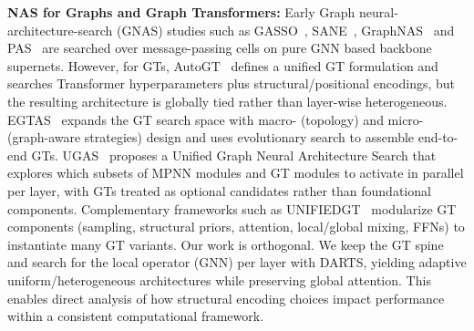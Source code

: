\documentclass[lettersize,journal]{IEEEtran}
\begin{document}
\textbf{NAS for Graphs and Graph Transformers:} Early Graph neural-architecture-search (GNAS) studies such as GASSO~\cite{qin_graph_2021}, SANE~\cite{zhao_search_2021}, GraphNAS~\cite{gao_graphnas_2019} and PAS~\cite{wei_neural_2024} are searched over message-passing cells on pure GNN based backbone supernets. However, for GTs, AutoGT~\cite{zhang_autogt_2023} defines a unified GT formulation and searches Transformer hyperparameters plus structural/positional encodings, but the resulting architecture is globally tied rather than layer-wise heterogeneous. EGTAS~\cite{wang_automatic_2024} expands the GT search space with macro- (topology) and micro- (graph-aware strategies) design and uses evolutionary search to assemble end-to-end GTs. UGAS~\cite{song_towards_2025} proposes a Unified Graph Neural Architecture Search that explores which subsets of MPNN modules and GT modules to activate in parallel per layer, with GTs treated as optional candidates rather than foundational components. Complementary frameworks such as UNIFIEDGT~\cite{lin_unifiedgt_2024} modularize GT components (sampling, structural priors, attention, local/global mixing, FFNs) to instantiate many GT variants. Our work is orthogonal. We keep the GT spine and search for the local operator (GNN) per layer with DARTS, yielding adaptive uniform/heterogeneous architectures while preserving global attention. This enables direct analysis of how structural encoding choices impact performance within a consistent computational framework.
\end{document}
